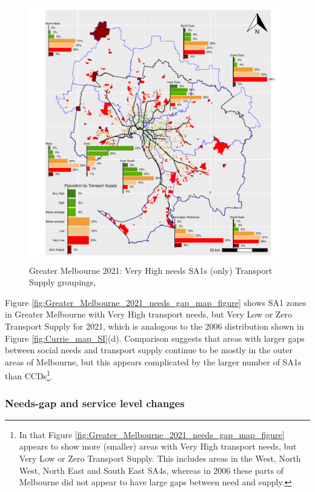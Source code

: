 \documentclass[preprint, 3p,
authoryear]{elsarticle} %
\begin{document}
\begin{figure}
\centering
\includegraphics{ReynoldsCurrieQu2024_files/figure-latex/Greater_Melbourne_2021_needs_gap_map_figure-1.pdf}
\caption{Greater Melbourne 2021: Very High needs SA1s (only) Transport
Supply groupings,}
\end{figure}

Figure \ref{fig:Greater_Melbourne_2021_needs_gap_map_figure} shows SA1
zones in Greater Melbourne with Very High transport needs, but Very Low
or Zero Transport Supply for 2021, which is analogous to the 2006
distribution shown in Figure \ref{fig:Currie_map_SI}(d). Comparison
suggests that areas with larger gaps between social needs and transport
supply continue to be mostly in the outer areas of Melbourne, but this
appears complicated by the larger number of SA1s than CCDs\footnote{In
  that Figure \ref{fig:Greater_Melbourne_2021_needs_gap_map_figure}
  appears to show more (smaller) areas with Very High transport needs,
  but Very Low or Zero Transport Supply. This includes areas in the
  West, North West, North East and South East SA4s, whereas in 2006
  these parts of Melbourne did not appear to have large gaps between
  need and supply.}.

\subsubsection{Needs-gap and service level
changes}\label{needs-gap-and-service-level-changes}
\end{document}
